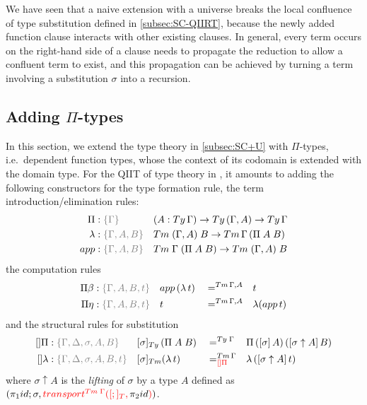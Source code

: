 \documentclass[a4paper,UKenglish,numberwithinsect,cleveref,thm-restate]{lipics-v2021}
\begin{document}
\begin{remark}
We have seen that a naive extension with a universe breaks the local confluence of type substitution defined in \cref{subsec:SC-QIIRT}, because the newly added function clause interacts with other existing clauses.
In general, every term occurs on the right-hand side of a clause needs to propagate the reduction to allow a confluent term to exist, and this propagation can be achieved by turning a term involving a substitution $\sigma$ into a recursion.
\end{remark}

\subsection{Adding \texorpdfstring{$\Pi$}{Π}-types} \label{subsec:SC+U+Pi}

In this section, we extend the type theory in \cref{subsec:SC+U} with $\Pi$-types, i.e.\ dependent function types, whose the context of its codomain is extended with the domain type.
For the QIIT of type theory in \cite{Altenkirch2016a}, it amounts to adding the following constructors for the type formation rule, the term introduction/elimination rules:
\begin{alignat*}{3}
  \Pi     &: \implicit{\Gamma}            && (A : \Ty\,\Gamma) \to \Ty\,(\Gamma, A) \to \Ty\,\Gamma \\
  \lambda &: \implicit{\Gamma, A, B}      && \Tm\;(\Gamma, A)\;B \to \Tm\,\Gamma\,(\Pi\;A\;B) \\
  \mathsf{app} &: \implicit{\Gamma, A, B} && \Tm\;\Gamma\;(\Pi\;A\;B) \to \Tm\;(\Gamma, A)\;B
\end{alignat*}
the computation rules
\begin{alignat*}{5}
  \Pi\beta           & : \implicit{\Gamma, A, B, t} && \mathsf{app}\,(\lambda\,t) && =^{\Tm\,\Gamma,A} && t \\
  \Pi\eta            & : \implicit{\Gamma, A, B, t} && t                        && =^{\Tm\,\Gamma,A} && \lambda(\mathsf{app}\,t)
\end{alignat*}
and the structural rules for substitution
\begin{alignat}{5}
  []\Pi              & : \implicit{\Gamma, \Delta, \sigma, A, B}    && [ \sigma ]_{\Ty}\,(\Pi\;A\;B) && =^{\Ty\;\Gamma} && \Pi\,(\sub{\sigma}{A})\,([\sigma\uparrow A]\,B) \label{eq:def-type-subst-8} \\
  \mathsf{[]\lambda} & : \implicit{\Gamma, \Delta, \sigma, A, B, t} && [\sigma]_{\Tm} (\lambda\,t) && =^{\Tm\,\Gamma}_{\alert{[]\Pi}} && \lambda\,([\sigma \uparrow A]\,t) \nonumber
\end{alignat}
where $\sigma \uparrow A$ is the \emph{lifting}  of $\sigma$ by a type $A$ defined as $(\pi_1\idS; \sigma, \alert{\transfib{\Tm\;\Gamma}{[;]_T}{\color{black}\pi_2\idS}})$. 
\end{document}
